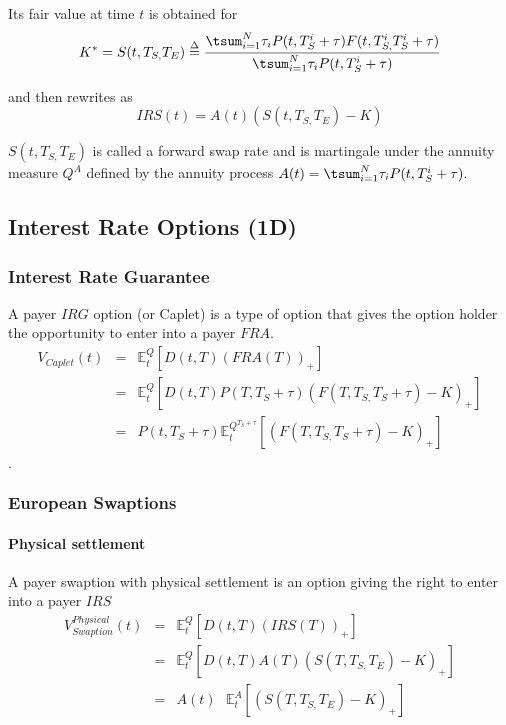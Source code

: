 \documentclass[3pt]{article}
\begin{document}
Its fair value at time $t$ is obtained for 
\begin{equation*}
K^{\ast }=S(t,T_{S,}T_{E})\overset{\Delta }{=}\frac{\tsum_{i=1}^{N}\tau
_{i}P(t,T_{S}^{i}+\tau )F(t,T_{S,}^{i}T_{S}^{i}+\tau )}{\tsum_{i=1}^{N}\tau
_{i}P(t,T_{S}^{i}+\tau )}
\end{equation*}

and then rewrites as%
\begin{equation*}
IRS(t)=A(t)\left( S(t,T_{S,}T_{E})-K\right)
\end{equation*}

$S(t,T_{S,}T_{E})$ is called a forward swap rate and is martingale under the
annuity measure $Q^{A}$ defined by the annuity process $A(t)=\tsum_{i=1}^{N}%
\tau _{i}P(t,T_{S}^{i}+\tau ).$

\subsection{Interest Rate Options (1D)}

\subsubsection{Interest Rate Guarantee}

A payer $IRG$ option (or Caplet) is a type of option that gives the option
holder the opportunity to enter into a payer $FRA$. 
\begin{eqnarray*}
V_{Caplet}(t) &=&\mathbb{E}_{t}^{Q}\left[ D(t,T)\left( FRA(T)\right) _{+}%
\right] \\
&=&\mathbb{E}_{t}^{Q}\left[ D(t,T)P(T,T_{S}+\tau )\left(
F(T,T_{S,}T_{S}+\tau )-K\right) _{+}\right] \\
&=&P(t,T_{S}+\tau )\mathbb{E}_{t}^{Q^{T_{S}+\tau }}\left[ \left(
F(T,T_{S,}T_{S}+\tau )-K\right) _{+}\right]
\end{eqnarray*}

$.$

\subsubsection{European Swaptions}

\paragraph{Physical settlement}

A payer swaption with physical settlement is an option giving the right to
enter into a payer $IRS$ \bigskip 
\begin{eqnarray*}
V_{Swaption}^{Physical}(t) &=&\mathbb{E}_{t}^{Q}\left[ D(t,T)\left(
IRS(T)\right) _{+}\right] \\
&=&\mathbb{E}_{t}^{Q}\left[ D(t,T)A(T)\left( S(T,T_{S,}T_{E})-K\right) _{+}%
\right] \\
&=&A(t)\text{ }\mathbb{E}_{t}^{A}\left[ \left( S(T,T_{S,}T_{E})-K\right) _{+}%
\right]
\end{eqnarray*}
\end{document}
